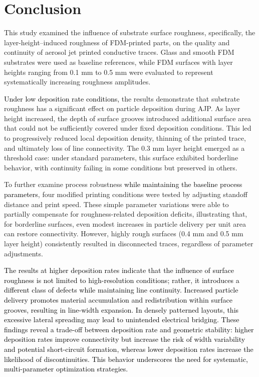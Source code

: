 \documentclass[subscriptcorrection,upint,varvw,balance,hyphenate]{asmejour}
\newcommand{\rev}[1]{\textcolor{black}{#1\xspace}}
\begin{document}
\section{Conclusion}
This study examined the influence of substrate surface roughness, specifically, the layer-height–induced roughness of FDM-printed parts, on the quality and continuity of aerosol jet printed conductive traces. Glass and smooth FDM substrates were used as baseline references, while FDM surfaces with layer heights ranging from 0.1 mm to 0.5 mm were evaluated to represent systematically increasing roughness amplitudes.

\rev{Under low deposition rate conditions,} the results demonstrate that substrate roughness has a significant effect on particle deposition during AJP. As layer height increased, the depth of surface grooves introduced additional surface area that could not be sufficiently covered under fixed deposition conditions. This led to progressively reduced local deposition density, thinning of the printed trace, and ultimately loss of line connectivity. The 0.3 mm layer height emerged as a threshold case: under standard parameters, this surface exhibited borderline behavior, with continuity failing in some conditions but preserved in others.

To further examine process robustness \rev{while maintaining the baseline process parameters}, four modified printing conditions were tested by adjusting standoff distance and print speed. These simple parameter variations were able to partially compensate for roughness-related deposition deficits, illustrating that, for borderline surfaces, even modest increases in particle delivery per unit area can restore connectivity. However, highly rough surfaces (0.4 mm and 0.5 mm layer height) consistently resulted in disconnected traces, regardless of parameter adjustments.

\rev{The results at higher deposition rates indicate that the influence of surface roughness is not limited to high-resolution conditions; rather, it introduces a different class of defects while maintaining line continuity. Increased particle delivery promotes material accumulation and redistribution within surface grooves, resulting in line-width expansion. In densely patterned layouts, this excessive lateral spreading may lead to unintended electrical bridging. These findings reveal a trade-off between deposition rate and geometric stability: higher deposition rates improve connectivity but increase the risk of width variability and potential short-circuit formation, whereas lower deposition rates increase the likelihood of discontinuities. This behavior underscores the need for systematic, multi-parameter optimization strategies.} 
\end{document}
